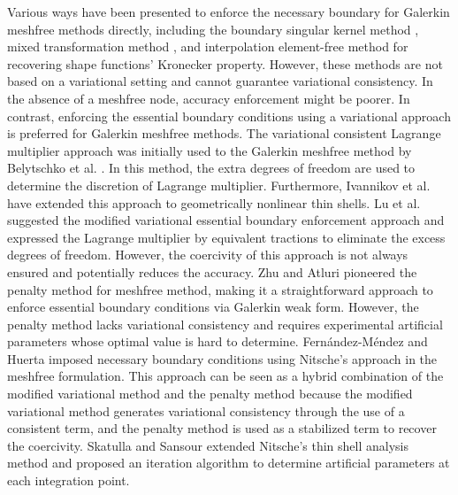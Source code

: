 Various ways have been presented to enforce the necessary boundary for Galerkin meshfree methods directly, including the boundary singular kernel method \cite{chen2000a}, mixed transformation method  \cite{chen2000a}, and interpolation element-free method \cite{liu2019a} for recovering shape functions’ Kronecker property. However, these methods are not based on a variational setting and cannot guarantee variational consistency. In the absence of a meshfree node, accuracy enforcement might be poorer. In contrast, enforcing the essential boundary conditions using a variational approach is preferred for Galerkin meshfree methods. The variational consistent Lagrange multiplier approach was initially used to the Galerkin meshfree method by Belytschko et al. \cite{belytschko1994}. In this method, the extra degrees of freedom are used to determine the discretion of Lagrange multiplier. Furthermore, Ivannikov et al. \cite{ivannikov2014a} have extended this approach to geometrically nonlinear thin shells. Lu et al. \cite{lu1994} suggested the modified variational essential boundary enforcement approach and expressed the Lagrange multiplier by equivalent tractions to eliminate the excess degrees of freedom. However, the coercivity of this approach is not always ensured and potentially reduces the accuracy. Zhu and Atluri \cite{zhu1998} pioneered the penalty method for meshfree method, making it a straightforward approach to enforce essential boundary conditions via Galerkin weak form. However, the penalty method lacks variational consistency and requires experimental artificial parameters whose optimal value is hard to determine. Fernández-Méndez and Huerta \cite{fernandez-mendez2004} imposed necessary boundary conditions using Nitsche's approach in the meshfree formulation. This approach can be seen as a hybrid combination of the modified variational method and the penalty method because the modified variational method generates variational consistency through the use of a consistent term, and the penalty method is used as a stabilized term to recover the coercivity. Skatulla and Sansour \cite{skatulla2008} extended Nitsche’s thin shell analysis method and proposed an iteration algorithm to determine artificial parameters at each integration point.

